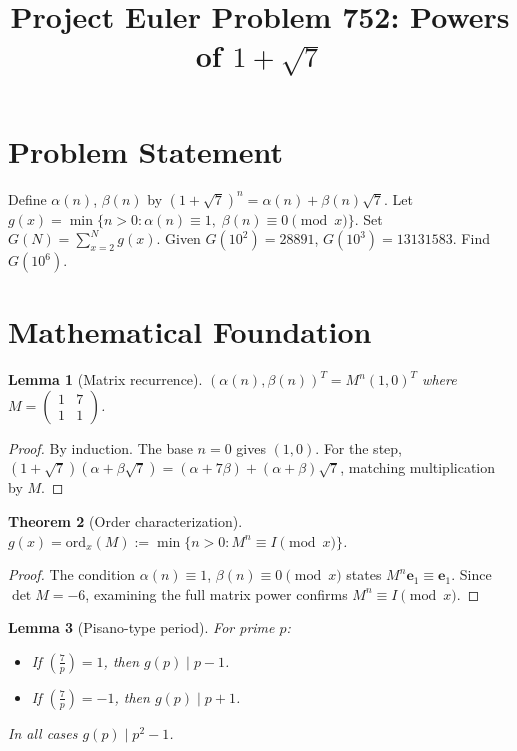 \documentclass[12pt]{article}
\title{Project Euler Problem 752: Powers of $1+\sqrt{7}$}
\author{}
\date{}
\newtheorem{theorem}{Theorem}
\newtheorem{lemma}[theorem]{Lemma}
\begin{document}
\maketitle

\section{Problem Statement}

Define $\alpha(n)$, $\beta(n)$ by $(1+\sqrt{7})^n = \alpha(n) + \beta(n)\sqrt{7}$. Let $g(x) = \min\{n > 0 : \alpha(n) \equiv 1,\; \beta(n) \equiv 0 \pmod{x}\}$. Set $G(N) = \sum_{x=2}^{N} g(x)$. Given $G(10^2) = 28891$, $G(10^3) = 13131583$. Find $G(10^6)$.

\section{Mathematical Foundation}

\begin{lemma}[Matrix recurrence]
$(\alpha(n), \beta(n))^T = M^n (1, 0)^T$ where $M = \begin{pmatrix} 1 & 7 \\ 1 & 1 \end{pmatrix}$.
\end{lemma}

\begin{proof}
By induction. The base $n=0$ gives $(1,0)$. For the step, $(1+\sqrt{7})(\alpha+\beta\sqrt{7}) = (\alpha+7\beta) + (\alpha+\beta)\sqrt{7}$, matching multiplication by $M$.
\end{proof}

\begin{theorem}[Order characterization]
$g(x) = \mathrm{ord}_x(M) := \min\{n > 0 : M^n \equiv I \pmod{x}\}$.
\end{theorem}

\begin{proof}
The condition $\alpha(n) \equiv 1$, $\beta(n) \equiv 0 \pmod{x}$ states $M^n \mathbf{e}_1 \equiv \mathbf{e}_1$. Since $\det M = -6$, examining the full matrix power confirms $M^n \equiv I \pmod{x}$.
\end{proof}

\begin{lemma}[Pisano-type period]
For prime $p$:
\begin{itemize}
\item If $\left(\frac{7}{p}\right) = 1$, then $g(p) \mid p-1$.
\item If $\left(\frac{7}{p}\right) = -1$, then $g(p) \mid p+1$.
\end{itemize}
In all cases $g(p) \mid p^2 - 1$.
\end{lemma}
\end{document}
